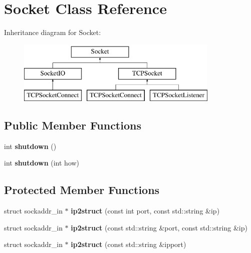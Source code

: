 \hypertarget{classSocket}{\section{Socket Class Reference}
\label{classSocket}
}
Inheritance diagram for Socket\-:\begin{figure}[H]
\begin{center}
\leavevmode
\includegraphics[height=3.000000cm]{classSocket}
\end{center}
\end{figure}
\subsection*{Public Member Functions}
\begin{DoxyCompactItemize}
\item 
\hypertarget{classSocket_a41a26876313a89591552648677320602}{int {\bfseries shutdown} ()}\label{classSocket_a41a26876313a89591552648677320602}

\item 
\hypertarget{classSocket_a8ca1576b3de3ff4685101c833ad3418c}{int {\bfseries shutdown} (int how)}\label{classSocket_a8ca1576b3de3ff4685101c833ad3418c}

\end{DoxyCompactItemize}
\subsection*{Protected Member Functions}
\begin{DoxyCompactItemize}
\item 
\hypertarget{classSocket_a7b44c495bfeddf489649464e8d5445e1}{struct sockaddr\-\_\-in $\ast$ {\bfseries ip2struct} (const int port, const std\-::string \&ip)}\label{classSocket_a7b44c495bfeddf489649464e8d5445e1}

\item 
\hypertarget{classSocket_ae3fd77c7223c9489b3b170a02d5fd385}{struct sockaddr\-\_\-in $\ast$ {\bfseries ip2struct} (const std\-::string \&port, const std\-::string \&ip)}\label{classSocket_ae3fd77c7223c9489b3b170a02d5fd385}

\item 
\hypertarget{classSocket_a6cb5eb88e856b00e1adb3cce809634f8}{struct sockaddr\-\_\-in $\ast$ {\bfseries ip2struct} (const std\-::string \&ipport)}\label{classSocket_a6cb5eb88e856b00e1adb3cce809634f8}

\end{DoxyCompactItemize}
